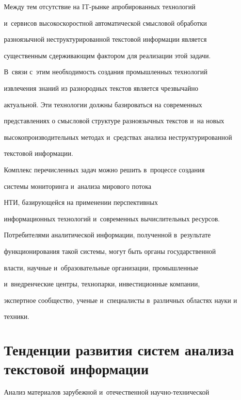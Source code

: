      


     Между тем отсутствие на IT-рынке апробированных технологий 


и~сервисов высокоскоростной автоматической смысловой обработки 


разноязычной неструктурированной текстовой информации является 


существенным сдерживающим фактором для реализации этой задачи. 


В~связи с~этим необходимость создания промышленных технологий 


извлечения знаний из разнородных текстов является чрезвычайно 


актуальной. Эти технологии должны базироваться на современных 


представлениях о смысловой структуре разноязычных текстов и~на новых 


высокопроизводительных методах и~средствах анализа неструктурированной 


текстовой информации. 


     


     Комплекс перечисленных задач можно решить в~процессе создания 


системы мониторинга и~анализа мирового потока 


НТИ, базирующейся на применении перспективных 


информационных технологий и~современных вычислительных ресурсов. 


Потребителями аналитической информации, полученной в~результате 


функционирования такой системы, могут быть органы государственной 


власти, научные и~образовательные организации, промышленные 


и~внедренческие центры, технопарки, инвестиционные компании, 


экспертное сообщество, ученые и~специалисты в~различных областях науки и~


техники.


     


\section{Тенденции развития систем анализа текстовой информации}


      


     Анализ материалов зарубежной и~отечественной научно-технической 


